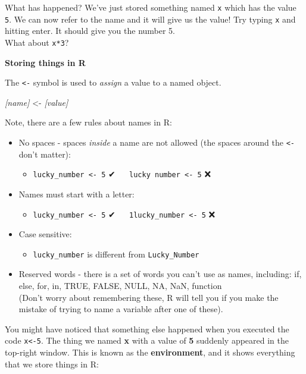 \documentclass[]{book}
\providecommand{\tightlist}{%
  \setlength{\itemsep}{0pt}\setlength{\parskip}{0pt}}
\begin{document}
What has happened? We've just stored something named \texttt{x} which has the value \texttt{5}.
We can now refer to the name and it will give us the value!
Try typing \texttt{x} and hitting enter. It should give you the number 5.\\
What about \texttt{x*3}?

\textbf{Storing things in R}

The \texttt{\textless{}-} symbol is used to \emph{assign} a value to a named object.

\emph{{[}name{]}} \textless{}- \emph{{[}value{]}}

Note, there are a few rules about names in R:

\begin{itemize}
\tightlist
\item
  No spaces - spaces \emph{inside} a name are not allowed (the spaces around the \texttt{\textless{}-} don't matter):

  \begin{itemize}
  \tightlist
  \item
    \texttt{lucky\_number\ \textless{}-\ 5} ✔   \texttt{lucky\ number\ \textless{}-\ 5} ❌\\
  \end{itemize}
\item
  Names must start with a letter:

  \begin{itemize}
  \tightlist
  \item
    \texttt{lucky\_number\ \textless{}-\ 5} ✔   \texttt{1lucky\_number\ \textless{}-\ 5} ❌\\
  \end{itemize}
\item
  Case sensitive:

  \begin{itemize}
  \tightlist
  \item
    \texttt{lucky\_number} is different from \texttt{Lucky\_Number}\\
  \end{itemize}
\item
  Reserved words - there is a set of words you can't use as names, including: if, else, for, in, TRUE, FALSE, NULL, NA, NaN, function\\
  (Don't worry about remembering these, R will tell you if you make the mistake of trying to name a variable after one of these).
\end{itemize}

You might have noticed that something else happened when you executed the code \texttt{x\textless{}-5}.
The thing we named \textbf{x} with a value of \textbf{5} suddenly appeared in the top-right window. This is known as the \textbf{environment}, and it shows everything that we store things in R:
\end{document}
